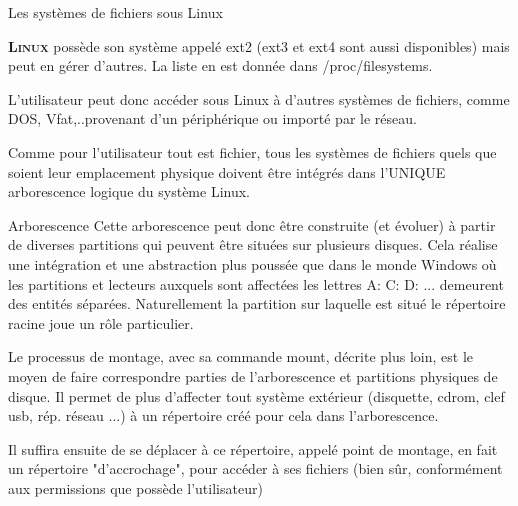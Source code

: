 \documentclass[10pt]{beamer}
\newcommand{\linux}{\textbf{\textsc{Linux}}\xspace}
\begin{document}
\begin{frame}{Les systèmes de fichiers sous Linux}

\linux possède son système appelé ext2 (ext3 et ext4 sont aussi disponibles) mais peut en gérer d'autres. La liste en est donnée dans /proc/filesystems.

L'utilisateur peut donc accéder sous Linux à d'autres systèmes de fichiers, comme DOS, Vfat,..provenant d'un périphérique ou importé par le réseau.

Comme pour l'utilisateur tout est fichier, tous les systèmes de fichiers quels que
soient leur emplacement physique doivent être intégrés dans l'UNIQUE arborescence logique du système Linux.
\end{frame}

\begin{frame}{Arborescence}
Cette arborescence peut donc être construite (et évoluer) à partir de diverses partitions qui   peuvent être situées sur plusieurs disques. Cela réalise une intégration et une abstraction plus poussée que dans le monde Windows où les partitions et lecteurs auxquels sont affectées les lettres A: C: D: ... demeurent des entités séparées. Naturellement la partition sur laquelle est situé le répertoire racine joue un rôle particulier.

Le processus de montage, avec sa commande \alert{mount}, décrite plus loin, est le moyen de faire correspondre parties de l'arborescence et partitions physiques de disque. Il permet de plus d'affecter tout système extérieur (disquette, cdrom,
clef usb, rép. réseau ...) à un répertoire créé pour cela dans l'arborescence.

Il suffira ensuite de se déplacer à ce répertoire, appelé point de montage, en fait un répertoire "d'accrochage", pour accéder à ses fichiers (bien sûr, conformément aux permissions que possède l'utilisateur)
\end{frame}
\end{document}
